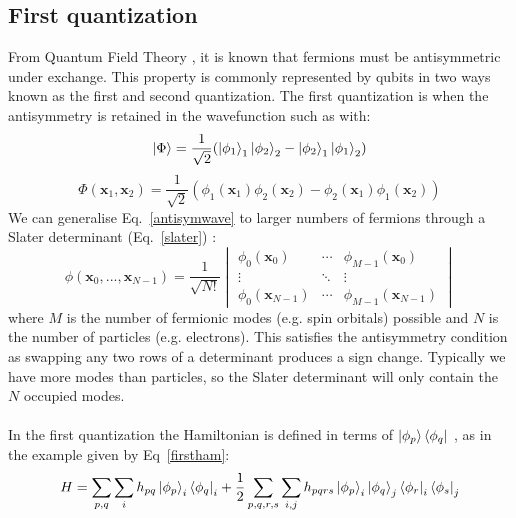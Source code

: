 \documentclass[twoside]{article}
\begin{document}
\subsection{First quantization}
From Quantum Field Theory \cite{qft}, it is known that fermions must be antisymmetric under exchange. This property is commonly represented by qubits in two ways known as the first and second quantization. The first quantization is when the antisymmetry is retained in the wavefunction such as with:
\begin{equation}\label{antisym}
        \ket{\Phi} = \frac{1}{\sqrt{2}}(\ket{\phi_1}_1 \ket{\phi_2}_2 - \ket{\phi_2}_1 \ket{\phi_1}_2)
\end{equation}
\begin{equation}\label{antisymwave}
        \Phi(\bm x_1, \bm x_2) = \frac{1}{\sqrt{2}}(\phi_1(\bm x_1) \phi_2(\bm x_2) - \phi_2(\bm x_1) \phi_1(\bm x_2))
\end{equation}
We can generalise Eq.~\ref{antisymwave} to larger numbers of fermions through a Slater determinant (Eq.~\ref{slater}) \cite{chemistryReview}:
\begin{equation}\label{slater}
        \phi(\bm x_0, ..., \bm x_{N-1}) = \frac{1}{\sqrt{N!}} 
        \begin{vmatrix} 
                \phi_0(\bm x_0) & \cdots & \phi_{M-1}(\bm x_0)\\
                \vdots & \ddots & \vdots \\
                \phi_0(\bm x_{N-1}) & \cdots & \phi_{M-1}(\bm x_{N-1})
        \end{vmatrix}
\end{equation}
where $M$ is the number of fermionic modes (e.g. spin orbitals) possible and $N$ is the number of particles (e.g. electrons). This satisfies the antisymmetry condition as swapping any two rows of a determinant produces a sign change. Typically we have more modes than particles, so the Slater determinant will only contain the $N$ occupied modes.\\\\ 
 In the first quantization the Hamiltonian is defined in terms of $\ket{\phi_p}\bra{\phi_q}$ \cite{tilly}, as in the example given by Eq~\ref{firstham}:
\begin{equation}
        \label{firstham}
        H = \sum_{p, q} \sum_i h_{pq}  \ket{\phi_p}_i \bra{\phi_q}_i + \frac{1}{2} \sum_{p,q,r,s}\sum_{i,j} h_{pqrs} \ket{\phi_p}_i \ket{\phi_q}_j \bra{\phi_r}_i \bra{\phi_s}_j
\end{equation}
\end{document}
